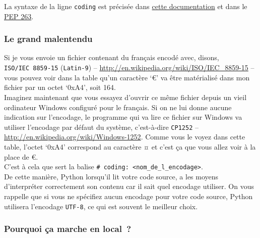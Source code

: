     \begin{Shaded}
\begin{Highlighting}[]
\end{Highlighting}
\end{Shaded}

    La syntaxe de la ligne \texttt{coding} est précisée dans
\href{https://docs.python.org/3/reference/lexical_analysis.html\#encoding-declarations}{cette
documentation} et dans le
\href{https://www.python.org/dev/peps/pep-0263/}{PEP 263}.

    \hypertarget{le-grand-malentendu}{%
\subsubsection{Le grand malentendu}\label{le-grand-malentendu}}

    Si je vous envoie un fichier contenant du français encodé avec, disons,
\texttt{ISO/IEC\ 8859-15} (\texttt{Latin-9}) --
\href{http://en.wikipedia.org/wiki/ISO/IEC\_8859-15}{http://en.wikipedia.org/wiki/ISO/IEC\_8859-15} -- vous pouvez voir dans
la table qu'un caractère `€' va être matérialisé dans mon fichier par un
octet `0xA4', soit 164.\\

Imaginez maintenant que vous essayez d'ouvrir ce même fichier depuis un
vieil ordinateur Windows configuré pour le français. Si on ne lui donne
aucune indication sur l'encodage, le programme qui va lire ce fichier
sur Windows va utiliser l'encodage par défaut du système, c'est-à-dire
\texttt{CP1252} -- \href{http://en.wikipedia.org/wiki/Windows-1252}{http://en.wikipedia.org/wiki/Windows-1252}. Comme vous
le voyez dans cette table, l'octet `0xA4' correspond au caractère ¤ et
c'est ça que vous allez voir à la place de €.\\

C'est à cela que sert la balise
\texttt{\#\ coding:\ \textless{}nom\_de\_l\_encodage\textgreater{}}.\\

De cette manière, Python lorsqu'il lit votre code source, a les moyens
d'interpréter correctement son contenu car il sait quel encodage
utiliser. On vous rappelle que si vous ne spécifiez aucun encodage pour
votre code source, Python utilisera l'encodage \texttt{UTF-8}, ce qui
est souvent le meilleur choix.

    \hypertarget{pourquoi-uxe7a-marche-en-local}{%
\subsubsection{Pourquoi ça marche en
local~?}\label{pourquoi-uxe7a-marche-en-local}}

